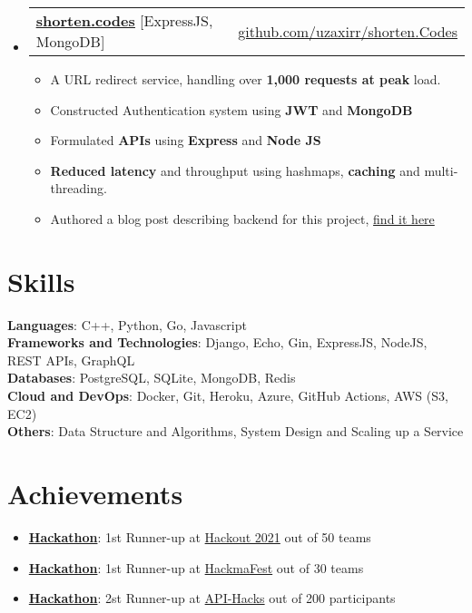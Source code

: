 \documentclass[letterpaper,11pt]{article}
\makeatletter
\newcommand{\resumeItem}[1]{
  \item\small{
    {#1 \vspace{-2pt}}
  }
}
\newcommand{\resumeProjectHeading}[2]{
    \item
    \begin{tabular*}{0.97\textwidth}{l@{\extracolsep{\fill}}r}
      \small#1 & #2 \\
    \end{tabular*}\vspace{-7pt}
}
\newcommand{\resumeSubHeadingListStart}{\begin{itemize}[leftmargin=0.15in, label={}]}
\newcommand{\resumeSubHeadingListEnd}{\end{itemize}}
\newcommand{\resumeItemListStart}{\begin{itemize}}
\newcommand{\resumeItemListEnd}{\end{itemize}\vspace{-5pt}}
\makeatother
\begin{document}
\resumeSubHeadingListStart
      \resumeProjectHeading
       {\textbf{\href{https://shorten.codes/}{\underline{shorten.codes}}}{            [ExpressJS, MongoDB]}}{\href{https://github.com/uzaxirr/shorten.Codes/}{github.com/uzaxirr/shorten.Codes}}
          \resumeItemListStart
           \resumeItem{A URL redirect service, handling over \textbf{1,000 requests at peak} load.}
           \resumeItem{Constructed Authentication system using \textbf{JWT} and \textbf{MongoDB}}
           \resumeItem{Formulated \textbf{APIs} using \textbf{Express} and \textbf{Node JS}}
           \resumeItem{\textbf{Reduced latency}  and throughput using hashmaps, \textbf{caching} and multi-threading.}
           \resumeItem{Authored a blog post describing backend for this project, \href{https://medium.com/@uzair-ali10/building-backend-of-a-url-shortening-service-part-i-b3b834895900}{find it here}}
          \resumeItemListEnd
    \resumeSubHeadingListEnd

\section{Skills}
 \begin{itemize}[leftmargin=0.15in, label={}]
    \small{\item{
     \textbf{Languages}{: C++, Python, Go, Javascript} \\
     \textbf{Frameworks and Technologies}{: Django, Echo, Gin, ExpressJS, NodeJS, REST APIs, GraphQL} \\
     \textbf{Databases}{: PostgreSQL, SQLite, MongoDB, Redis} \\
     \textbf{Cloud and DevOps}{: Docker, Git, Heroku, Azure, GitHub Actions, AWS (S3, EC2)} \\
     \textbf{Others}{: Data Structure and Algorithms, System Design and Scaling up a Service}\\
    }}
 \end{itemize}

\section{Achievements}
 \begin{itemize}[leftmargin=0.15in, label={}]
    \small{\item{
        \resumeItemListStart
                \resumeItem{\textbf{\href{Link if any}{Hackathon}}: 1st Runner-up at \href{https://www.hackout.io/}{Hackout 2021} out of 50 teams}
                \resumeItem{\textbf{\href{Link if any}{Hackathon}}: 1st Runner-up at \href{https://hackmafest.tech/}{HackmaFest} out of 30 teams}
                \resumeItem{\textbf{\href{Link if any}{Hackathon}}: 2st Runner-up at \href{https://apihacks.co/}{API-Hacks} out of 200 participants}
      \resumeItemListEnd
    }}
 \end{itemize}
\end{document}
